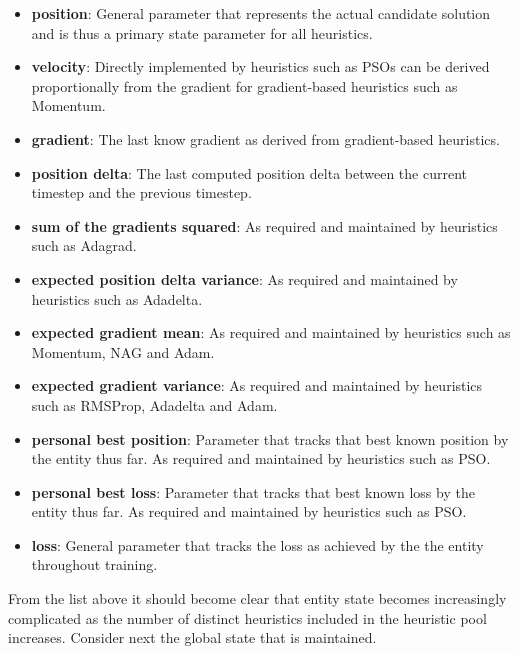 \begin{itemize}
    \item \textbf{position}: General parameter that represents the actual candidate solution and is thus a primary state parameter for all heuristics.
    
    \item \textbf{velocity}: Directly implemented by heuristics such as \acp{PSO} can be derived proportionally from the gradient for gradient-based heuristics such as \ac{Momentum}.
    
    \item \textbf{gradient}: The last know gradient as derived from gradient-based heuristics.
    
    \item \textbf{position delta}: The last computed position delta between the current timestep and the previous timestep.
    
    \item \textbf{sum of the gradients squared}: As required and maintained by heuristics such as \ac{Adagrad}.
    
    \item \textbf{expected position delta variance}: As required and maintained by heuristics such as \ac{Adadelta}.
    
    \item \textbf{expected gradient mean}: As required and maintained by heuristics such as \ac{Momentum}, \ac{NAG} and \ac{Adam}.
    
    \item \textbf{expected gradient variance}: As required and maintained by heuristics such as \ac{RMSProp}, \ac{Adadelta} and \ac{Adam}.
    
    \item \textbf{personal best position}: Parameter that tracks that best known position by the entity thus far. As required and maintained by heuristics such as \ac{PSO}.
    
    \item \textbf{personal best loss}: Parameter that tracks that best known loss by the entity thus far. As required and maintained by heuristics such as \ac{PSO}.
    
    \item \textbf{loss}: General parameter that tracks the loss as achieved by the the entity throughout training.
\end{itemize}

From the list above it should become clear that entity state becomes increasingly complicated as the number of distinct heuristics included in the heuristic pool increases. Consider next the global state that is maintained.


